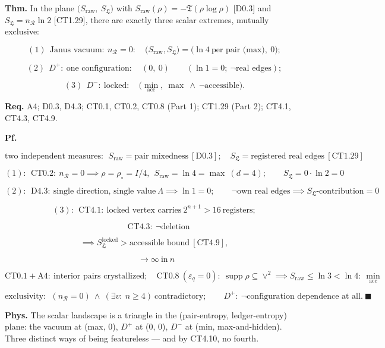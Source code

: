 \begin{theorem}\label{tag:CT4-7}
\textbf{Thm.} In the plane $\bigl(S_{\mathrm{raw}},\ S_{\mathfrak L}\bigr)$ with $S_{\mathrm{raw}}(\rho)=-\mathfrak T(\rho\log\rho)$ [D0.3] and $S_{\mathfrak L}=n_{\mathcal R}\ln2$ [CT1.29], there are exactly three scalar extremes, mutually exclusive:

\[
(1)\ \ \text{Janus vacuum}:\ n_{\mathcal R}=0:\quad\bigl(S_{\mathrm{raw}},S_{\mathfrak L}\bigr)=\bigl(\ln4\ \text{per pair (max)},\ 0\bigr);
\]

\[
(2)\ \ D^+:\ \text{one configuration}:\quad(0,\ 0)\qquad(\ln1=0;\ \neg\text{real edges});
\]

\[
(3)\ \ D^-:\ \text{locked}:\quad\bigl(\min_{\mathrm{acc}},\ \max\ \wedge\ \neg\text{accessible}\bigr).
\]

\textbf{Req.} A4; D0.3, D4.3; CT0.1, CT0.2, CT0.8 (Part 1); CT1.29 (Part 2); CT4.1, CT4.3, CT4.9.

\textbf{Pf.}

\[
\text{two independent measures}:\ \ S_{\mathrm{raw}}=\text{pair mixedness}\ [\mathrm{D0.3}];\quad S_{\mathfrak L}=\text{registered real edges}\ [\mathrm{CT1.29}]
\]

\[
(1):\ \ \mathrm{CT0.2}:\ n_{\mathcal R}=0\implies\rho=\rho_\circ=I/4,\ \ S_{\mathrm{raw}}=\ln4=\max\ (d=4);\qquad S_{\mathfrak L}=0\cdot\ln2=0
\]

\[
(2):\ \ \mathrm{D4.3}:\ \text{single direction, single value}\ \Lambda\implies\ln1=0;\qquad\neg\text{own real edges}\implies S_{\mathfrak L}\text{-contribution}=0
\]

\[
(3):\ \ \mathrm{CT4.1}:\ \text{locked vertex carries}\ 2^{n+1}>16\ \text{registers};
\]

\[
\quad\mathrm{CT4.3}:\ \neg\text{deletion}
\]

\[
\implies S_{\mathfrak L}^{\text{locked}}>\text{accessible bound}\ [\mathrm{CT4.9}],
\]

\[
\ \ \to\infty\ \text{in}\ n
\]

\[
\mathrm{CT0.1}+\mathrm{A4}:\ \text{interior pairs crystallized};\quad
\mathrm{CT0.8}\ (\varepsilon_q=0):\ \operatorname{supp}\rho\subseteq\vee^2\implies S_{\mathrm{raw}}\le\ln3<\ln4:\ \min_{\mathrm{acc}}
\]

\[
\text{exclusivity}:\ \ (n_{\mathcal R}=0)\ \wedge\ (\exists v:\ n\ge4)\ \text{contradictory};\qquad D^+:\ \neg\text{configuration dependence at all}.\ \blacksquare
\]

\textbf{Phys.} The scalar landscape is a triangle in the (pair-entropy, ledger-entropy) plane: the vacuum at (max, 0), $D^+$ at (0, 0), $D^-$ at (min, max-and-hidden). Three distinct ways of being featureless — and by CT4.10, no fourth.

\end{theorem}

